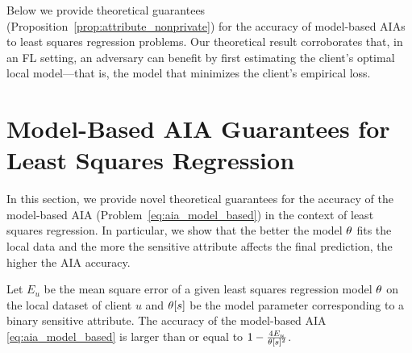 Below we provide theoretical guarantees (Proposition~\ref{prop:attribute_nonprivate}) for the accuracy of model-based AIAs to least squares regression problems. %
Our theoretical result corroborates that, in an FL setting,  an adversary can benefit by first estimating the client’s optimal local model---that is, the model that minimizes the client’s empirical loss.

\section{Model-Based AIA Guarantees for Least Squares Regression}
\label{sec:model-based-guarantees}
In this section, we provide novel theoretical guarantees for the accuracy of the model-based AIA (Problem~\eqref{eq:aia_model_based}) in the context of least squares regression. In particular, we show that the better the model $\theta$ fits the local data and the more the sensitive attribute affects the final prediction, the higher the AIA accuracy.
 \begin{prop}\label{prop:attribute_nonprivate}
Let $E_u$ be the mean square error of a given least squares regression model $\theta$ on the local dataset of client $u$ and $\theta[s]$ be the model parameter corresponding to a binary sensitive attribute. The accuracy of the model-based AIA \eqref{eq:aia_model_based} is larger than or equal to $1-\frac{4E_u}{\theta[s]^2}$. 
\end{prop}

